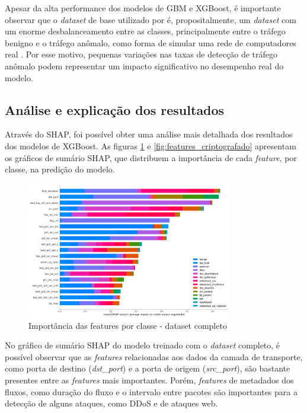 \documentclass[12pt]{article}
\begin{document}
Apesar da alta performance dos modelos de GBM e XGBoost, é importante observar que o \emph{dataset} de base utilizado por \cite{rosay2021cic} é, propositalmente, um \emph{dataset} com um enorme desbalanceamento entre as classes, principalmente entre o tráfego benigno e o tráfego anômalo, como forma de simular uma rede de computadores real \cite{ring2019survey}. Por esse motivo, pequenas variações nas taxas de detecção de tráfego anômalo podem representar um impacto significativo no desempenho real do modelo.

\subsection{Análise e explicação dos resultados}
\label{sec:resultados_explicabilidade}

Através do SHAP, foi possível obter uma análise mais detalhada dos resultados dos modelos de XGBoost. As figuras \ref{fig:features_completo} e \ref{fig:features_criptografado} apresentam os gráficos de sumário SHAP, que distribuem a importância de cada \emph{feature}, por classe, na predição do modelo.

\begin{figure}[h!]
    \centering
    \includegraphics[width=0.8\textwidth]{figures/feature_importance_completo.png}
    \caption{Importância das features por classe - dataset completo}
    \label{fig:features_completo}
\end{figure}

No gráfico de sumário SHAP do modelo treinado com o \emph{dataset} completo, é possível observar que as \emph{features} relacionadas aos dados da camada de transporte, como porta de destino (\textit{dst\_port}) e a porta de origem (\textit{src\_port}), são bastante presentes entre as \emph{features} mais importantes. Porém, \emph{features} de metadados dos fluxos, como duração do fluxo e o intervalo entre pacotes são importantes para a detecção de alguns ataques, como DDoS e de ataques web.
\end{document}
